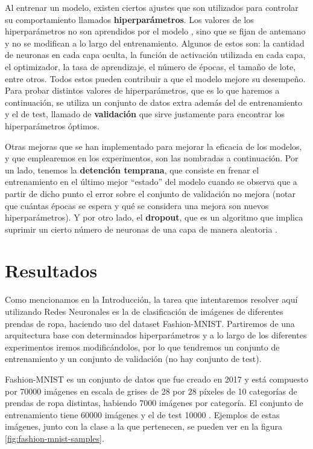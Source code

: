 \documentclass[aps,twocolumn,groupedaddress]{revtex4-2}
\begin{document}
Al entrenar un modelo, existen ciertos ajustes que son utilizados para controlar su comportamiento llamados \textbf{hiperparámetros}. Los valores de los hiperparámetros no son aprendidos por el modelo \cite{deep-learning}, sino que se fijan de antemano y no se modifican a lo largo del entrenamiento. Algunos de estos son: la cantidad de neuronas en cada capa oculta, la función de activación utilizada en cada capa, el optimizador, la tasa de aprendizaje, el número de épocas, el tamaño de lote, entre otros. Todos estos pueden contribuir a que el modelo mejore su desempeño. Para probar distintos valores de hiperparámetros, que es lo que haremos a continuación, se utiliza un conjunto de datos extra además del de entrenamiento y el de test, llamado de \textbf{validación} que sirve justamente para encontrar los hiperparámetros óptimos.

Otras mejoras que se han implementado para mejorar la eficacia de los modelos, y que emplearemos en los experimentos, son las nombradas a continuación. Por un lado, tenemos la \textbf{detención temprana}, que consiste en frenar el entrenamiento en el último mejor ``estado'' del modelo cuando se observa que a partir de dicho punto el error sobre el conjunto de validación no mejora (notar que cuántas épocas se espera y qué se considera una mejora son nuevos hiperparámetros). Y por otro lado, el \textbf{dropout}, que es un algoritmo que implica suprimir un cierto número de neuronas de una capa de manera aleatoria \cite{apuntes-redes-neuronales}. 

\section{Resultados}
Como mencionamos en la Introducción, la tarea que intentaremos resolver aquí utilizando Redes Neuronales es la de clasificación de imágenes de diferentes prendas de ropa, haciendo uso del dataset Fashion-MNIST. Partiremos de una arquitectura base con determinados hiperparámetros y a lo largo de los diferentes experimentos iremos modificándolos, por lo que tendremos un conjunto de entrenamiento y un conjunto de validación (no hay conjunto de test).

Fashion-MNIST es un conjunto de datos que fue creado en 2017 y está compuesto por 70000 imágenes en escala de grises de 28 por 28 píxeles de 10 categorías de prendas de ropa distintas, habiendo 7000 imágenes por categoría.  El conjunto de entrenamiento tiene 60000 imágenes y el de test 10000 \cite{fashion-mnist}. Ejemplos de estas imágenes, junto con la clase a la que pertenecen, se pueden ver en la figura \ref{fig:fashion-mnist-samples}.
\end{document}
